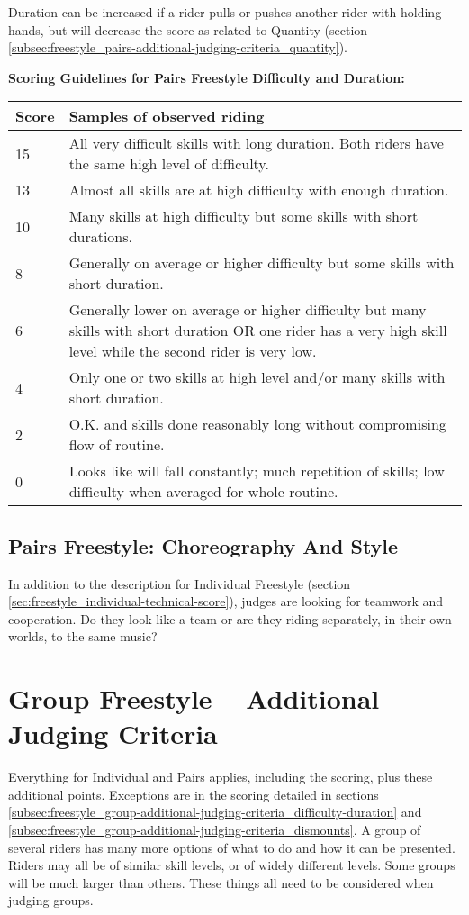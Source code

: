 Duration can be increased if a rider pulls or pushes another rider with holding hands, but will decrease the score as related to Quantity (section \ref{subsec:freestyle_pairs-additional-judging-criteria_quantity}).

\begin{minipage}{\textwidth}
\textbf{Scoring Guidelines for Pairs Freestyle Difficulty and Duration:} \\

\begin{tabular}{|l|p{12.5cm}|}
\hline
\textbf{Score} & \textbf{Samples of observed riding} \\
\hline 
15 & All very difficult skills with long duration. Both riders have the same high level of difficulty. \\
\hline
13 & Almost all skills are at high difficulty with enough duration. \\
\hline
10 & Many skills at high difficulty but some skills with short durations. \\
\hline
8 & Generally on average or higher difficulty but some skills with short duration. \\
\hline
6 & Generally lower on average or higher difficulty but many skills with short duration OR one rider has a very high skill level while the second rider is very low. \\
\hline
4 & Only one or two skills at high level and/or many skills with short duration. \\
\hline
2 & O.K. and skills done reasonably long without compromising flow of routine. \\
\hline
0 & Looks like will fall constantly; much repetition of skills; low difficulty when averaged for whole routine. \\
\hline
\end{tabular}
\end{minipage}

\subsection{Pairs Freestyle: Choreography And Style}
In addition to the description for Individual Freestyle (section \ref{sec:freestyle_individual-technical-score}), judges are looking for teamwork and cooperation.
Do they look like a team or are they riding separately, in their own worlds, to the same music?

\section{Group Freestyle – Additional Judging Criteria}
Everything for Individual and Pairs applies, including the scoring, plus these additional points.
Exceptions are in the scoring detailed in sections \ref{subsec:freestyle_group-additional-judging-criteria_difficulty-duration} and \ref{subsec:freestyle_group-additional-judging-criteria_dismounts}.
A group of several riders has many more options of what to do and how it can be presented.
Riders may all be of similar skill levels, or of widely different levels.
Some groups will be much larger than others.
These things all need to be considered when judging groups.

